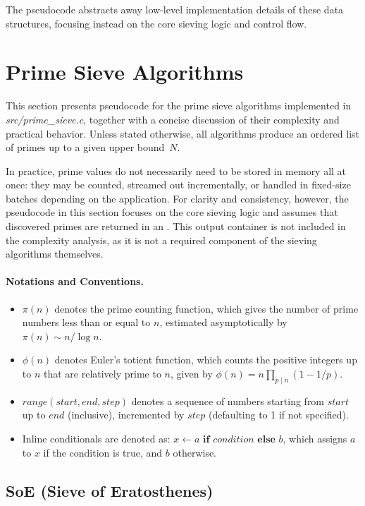 \documentclass{article}
\begin{document}
The pseudocode abstracts away low-level implementation details of these data structures, focusing instead on the core sieving logic and control flow.

\tableofcontents

\section{Prime Sieve Algorithms}

This section presents pseudocode for the prime sieve algorithms implemented in \emph{src/prime\_sieve.c}, together with a concise discussion of their complexity and practical behavior. Unless stated otherwise, all algorithms produce an ordered list of primes up to a given upper bound~$N$.

In practice, prime values do not necessarily need to be stored in memory all at once: they may be counted, streamed out incrementally, or handled in fixed-size batches depending on the application. For clarity and consistency, however, the pseudocode in this section focuses on the core sieving logic and assumes that discovered primes are returned in an . This output container is not included in the complexity analysis, as it is not a required component of the sieving algorithms themselves.

\paragraph{Notations and Conventions.}
\begin{itemize}[leftmargin=*]
    \item $\pi(n)$ denotes the prime counting function, which gives the number of prime numbers less than or equal to $n$, estimated asymptotically by $\pi(n) \sim n/\log n$.
    \item $\phi(n)$ denotes Euler's totient function, which counts the positive integers up to $n$ that are relatively prime to $n$, given by $\phi(n) = n \prod_{p \mid n} (1 - 1/p)$.
    \item $range(start, end, step)$ denotes a sequence of numbers starting from $start$ up to $end$ (inclusive), incremented by $step$ (defaulting to 1 if not specified).
    \item Inline conditionals are denoted as: $x \gets a \textbf{ if } condition \textbf{ else } b$, which assigns $a$ to $x$ if the condition is true, and $b$ otherwise.
\end{itemize}

\subsection{SoE (Sieve of Eratosthenes)} \label{alg:soe}
\end{document}
